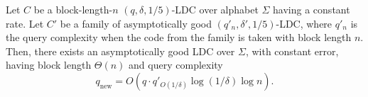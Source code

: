 \setcounter{nttheorem}{71}
\begin{nttheorem}
Let $C$ be a block-length-$n$ $(q,\delta,1/5)$-LDC over alphabet $\Sigma$ having a constant rate. Let $C'$ be a family of asymptotically good $(q'_n,\delta',1/5)$-LDC, where $q'_n$ is the query complexity when the code from the family is taken with block length $n$. Then, there exists an asymptotically good LDC over $\Sigma$, with constant error, having block length $\Theta(n)$ and query complexity
\begin{equation}q_{\mathrm{new}}=O\left(q\cdot q'_{O(1/\delta)}\log(1/\delta)\log n\right).\tag{6.2}\end{equation}
\end{nttheorem}
